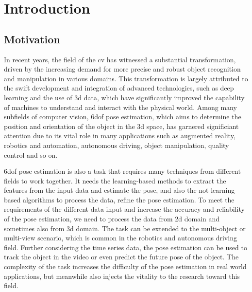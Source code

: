 \documentclass[12pt,DIV14,BCOR12mm,a4paper,footinclude=false,headinclude,parskip=half-,twoside,openright,cleardoublepage=empty,toc=index,bibliography=totoc,listof=totoc]{scrreprt}
\title{\maintitle}%
\subtitle{\translatedtitle}
\author{
\large
  \ifthenelse{\equal{\doclang}{german}}{
  \begin{tabular}{rp{7cm}}
    \Large 
    Autor:      & \Large \student \vspace*{2mm}\\
    Ausgabe:    & \startdate \\
    Abgabe:     & \submission \vspace*{3mm}\\
    Betreuer:   & \tutor \vspace*{2mm}\\
    Stichworte: & \keywords
  \end{tabular}
  }{
  \begin{tabular}{rp{7cm}}
    \Large 
    Author:             & \Large \student \vspace*{2mm}\\
    Date of work begin: & \startdate \\
    Date of submission: & \submission \vspace*{3mm}\\
    Supervisor:         & \tutor \vspace*{2mm}\\
    Keywords:           & \keywords
  \end{tabular}
  }
  \bugfix
}
\date{}
\numberwithin{equation}{chapter}
\begin{document}
\maketitle
\cleardoublepage
{} %
\tableofcontents
\cleardoublepage
\setcounter{page}{1}




\setlength\LTleft{-5pt}
\printglossary[type=\acronymtype,title=List of Acronyms,nonumberlist,style=custom_acronyms]

\printnomenclature

\chapter{Introduction}
\section{Motivation}
In recent years, the field of the \gls{cv} has witnessed a substantial transformation, driven by the increasing demand for more precise and robust object recognition and manipulation in various domains. This transformation is largely attributed to the swift development and integration of advanced technologies, such as deep learning and the use of \gls{3d} data, which have significantly improved the capability of machines to understand and interact with the physical world. Among many subfields of computer vision, \gls{6dof} pose estimation, which aims to determine the position and orientation of the object in the \gls{3d} space, has garnered significiant attention due to its vital role in many applications such as augmented reality, robotics and automation, autonomous driving, object manipulation, quality control and so on.

\gls{6dof} pose estimation is also a task that requires many techniques from different fields to work together. It needs the learning-based methods to extract the features from the input data and estimate the pose, and also the not learning-based algorithms to process the data, refine the pose estimation. To meet the requirements of the different data input and increase the accuracy and reliability of the pose estimation, we need to process the data from \gls{2d} domain and sometimes also from \gls{3d} domain. The task can be extended to the multi-object or multi-view scenario, which is common in the robotics and autonomous driving field. Further considering the time series data, the pose estimation can be used to track the object in the video or even predict the future pose of the object. The complexity of the task increases the difficulty of the pose estimation in real world applications, but meanwhile also injects the vitality to the research toward this field.
\end{document}
